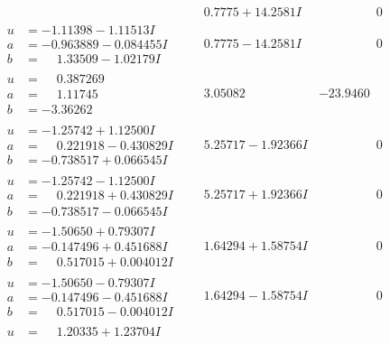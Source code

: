 \documentclass[1p]{elsarticle_modified}
\theoremstyle{definition}
\begin{document}
$$\begin{array}{c|c|c}
 & \phantom{-}0.7775 + 14.2581 I & \phantom{-0.000000 } 0 \\ \hline\begin{aligned}
u &= -1.11398 - 1.11513 I \\
a &= -0.963889 - 0.084455 I \\
b &= \phantom{-}1.33509 - 1.02179 I\end{aligned}
 & \phantom{-}0.7775 - 14.2581 I & \phantom{-0.000000 } 0 \\ \hline\begin{aligned}
u &= \phantom{-}0.387269\phantom{ +0.000000I} \\
a &= \phantom{-}1.11745\phantom{ +0.000000I} \\
b &= -3.36262\phantom{ +0.000000I}\end{aligned}
 & \phantom{-}3.05082\phantom{ +0.000000I} & -23.9460\phantom{ +0.000000I} \\ \hline\begin{aligned}
u &= -1.25742 + 1.12500 I \\
a &= \phantom{-}0.221918 - 0.430829 I \\
b &= -0.738517 + 0.066545 I\end{aligned}
 & \phantom{-}5.25717 - 1.92366 I & \phantom{-0.000000 } 0 \\ \hline\begin{aligned}
u &= -1.25742 - 1.12500 I \\
a &= \phantom{-}0.221918 + 0.430829 I \\
b &= -0.738517 - 0.066545 I\end{aligned}
 & \phantom{-}5.25717 + 1.92366 I & \phantom{-0.000000 } 0 \\ \hline\begin{aligned}
u &= -1.50650 + 0.79307 I \\
a &= -0.147496 + 0.451688 I \\
b &= \phantom{-}0.517015 + 0.004012 I\end{aligned}
 & \phantom{-}1.64294 + 1.58754 I & \phantom{-0.000000 } 0 \\ \hline\begin{aligned}
u &= -1.50650 - 0.79307 I \\
a &= -0.147496 - 0.451688 I \\
b &= \phantom{-}0.517015 - 0.004012 I\end{aligned}
 & \phantom{-}1.64294 - 1.58754 I & \phantom{-0.000000 } 0 \\ \hline\begin{aligned}
u &= \phantom{-}1.20335 + 1.23704 I \\

\end{aligned}
\end{array}$$
\end{document}
